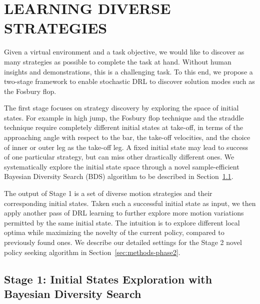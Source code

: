 \section{LEARNING DIVERSE STRATEGIES}
\label{sec:diverse}
Given a virtual environment and a task objective, we would like to discover as many strategies as possible to complete the task at hand. Without human insights and demonstrations, this is a challenging task. To this end, we propose a two-stage framework to enable stochastic DRL to discover solution modes such as the Fosbury flop.

The first stage focuses on strategy discovery by exploring the space of initial states. For example in high jump, the Fosbury flop technique and the straddle technique require completely different initial states at take-off, in terms of the approaching angle with respect to the bar, the take-off velocities, and the choice of inner or outer leg as the take-off leg. A fixed initial state may lead to success of one particular strategy, but can miss other drastically different ones. We systematically explore the initial state space through a novel sample-efficient Bayesian Diversity Search (BDS) algorithm to be described in Section~\ref{sec:methods-bayesian-diversity-search}.

The output of Stage 1 is a set of diverse motion strategies and their corresponding initial states. Taken such a successful initial state as input, we then apply another pass of DRL learning to further explore more motion variations permitted by the same initial state. The intuition is to explore different local optima while maximizing the novelty of the current policy, compared to previously found ones. We describe our detailed settings for the Stage 2 novel policy seeking algorithm in Section~\ref{sec:methods-phase2}.

\subsection{Stage 1: Initial States Exploration with Bayesian Diversity Search}\label{sec:methods-bayesian-diversity-search}

